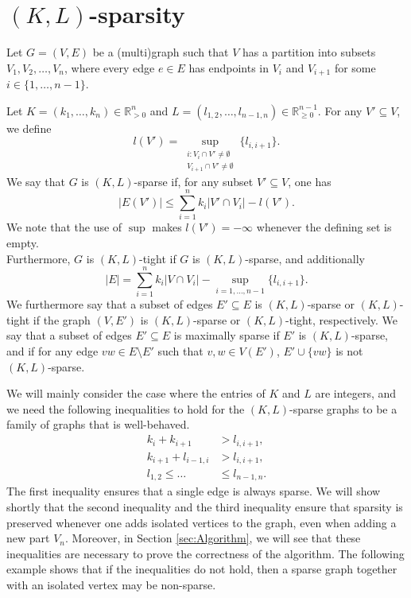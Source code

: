 \documentclass{article}
\begin{document}
\section{$(K,L)$-sparsity}\label{sec:greedoid}
\begin{definition}\label{KL-sparse}
    Let $G=(V,E)$ be a (multi)graph such that $V$ has a partition into subsets $V_1, V_2, \dots, V_n$, where every edge $e\in E$ has endpoints in $V_i$  and $V_{i+1}$ for some $i\in \{1,\dots, n-1\}$.
    
       Let $K=(k_1,\dots, k_n)\in \mathbb{R}_{>0}^{n}$ and ${L=(l_{1,2}, \dots , l_{n-1, n}) \in \mathbb{R}_{\geq 0}^{n-1}}$. For any $V'\subseteq V$, we define
    \begin{equation*}
        l(V') = \underset{\substack{
       i: V_{i}\cap V'\neq \emptyset\\ 
       V_{i+1}\cap V'\neq \emptyset}}
       {\sup} \{l_{i,i+1}\}.
    \end{equation*}
    We say that $G$ is $(K,L)$-sparse if, for any subset $V' \subseteq V$, one has
    \begin{equation*}
       \vert E(V')\vert \leq \sum_{i=1}^{n} k_i\vert V' \cap V_i\vert -l(V').
    \end{equation*}
    We note that the use of $\sup$ makes $l(V')=-\infty$ whenever the defining set is empty.\\ 
    Furthermore, $G$ is $(K,L)$-tight if $G$ is $(K,L)$-sparse, and additionally
        \begin{equation*}
       \vert E\vert = \sum_{i=1}^{n} k_i\vert V \cap V_i\vert -\sup_{i=1,\dots, n-1} \{l_{i,i+1}\}.
    \end{equation*}
    We furthermore say that a subset of edges $E'\subseteq E$ is $(K, L)$-sparse or $(K, L)$-tight if the graph $(V, E')$ is $(K,L)$-sparse or $(K,L)$-tight, respectively.  We say that a subset of edges $E'\subseteq E$ is maximally sparse if $E'$ is $(K,L)$-sparse, and if for any edge $vw \in E \setminus E'$ such that $v,w \in V(E')$, $E'\cup \{vw\}$ is not $(K,L)$-sparse.
\end{definition}

We will mainly consider the case where the entries of $K$ and $L$ are integers, and we need the following inequalities to hold for the $(K,L)$-sparse graphs to be a family of graphs that is well-behaved. 
\begin{align}
    k_i + k_{i+1} &> l_{i, i+1} \label{conditionposet1 -k k l},\\
    k_{i+1} + l_{i-1, i} &> l_{i, i+1}\label{conditionposet2 - k l l},\\
     l_{1,2} \leq  \dots &\leq l_{n-1,n}. \label{conditionposet3-increasing}
\end{align}
The first inequality ensures that a single edge is always sparse.
We will show shortly that the second inequality and the third inequality ensure that sparsity is preserved whenever one adds isolated vertices to the graph, even when adding a new part $V_{n}$. Moreover, in Section \ref{sec:Algorithm}, we will see that these inequalities are necessary to prove the correctness of the algorithm. The following example shows that if the inequalities do not hold, then a sparse graph together with an isolated vertex may be non-sparse.
\end{document}
